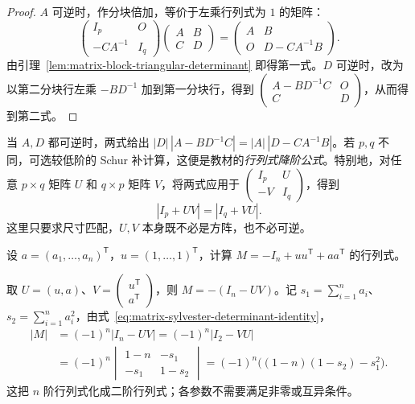 \begin{proof}
$A$ 可逆时，作分块倍加，等价于左乘行列式为 $1$ 的矩阵：
\[
    \begin{pmatrix}I_p&O\\-CA^{-1}&I_q\end{pmatrix}
    \begin{pmatrix}A&B\\C&D\end{pmatrix}
    =\begin{pmatrix}A&B\\O&D-CA^{-1}B\end{pmatrix}.
\]
由引理~\ref{lem:matrix-block-triangular-determinant} 即得第一式。$D$ 可逆时，改为以第二分块行左乘 $-BD^{-1}$ 加到第一分块行，得到 $\begin{pmatrix}A-BD^{-1}C&O\\C&D\end{pmatrix}$，从而得到第二式。
\end{proof}

当 $A,D$ 都可逆时，两式给出 $|D|\,|A-BD^{-1}C|=|A|\,|D-CA^{-1}B|$。若 $p,q$ 不同，可选较低阶的 Schur 补计算，这便是教材的\emph{行列式降阶公式}。特别地，对任意 $p\times q$ 矩阵 $U$ 和 $q\times p$ 矩阵 $V$，将两式应用于 $\begin{pmatrix}I_p&U\\-V&I_q\end{pmatrix}$，得到
\begin{equation}
\label{eq:matrix-sylvester-determinant-identity}
    |I_p+UV|=|I_q+VU|.
\end{equation}
这里只要求尺寸匹配，$U,V$ 本身既不必是方阵，也不必可逆。

\begin{example}
\label{ex:matrix-block-determinant-reduction}
设 $a=(a_1,\ldots,a_n)^{\mathsf T}$，$u=(1,\ldots,1)^{\mathsf T}$，计算 $M=-I_n+uu^{\mathsf T}+aa^{\mathsf T}$ 的行列式。
\end{example}

\begin{solve}
取 $U=(u,a)$、$V=\begin{pmatrix}u^{\mathsf T}\\a^{\mathsf T}\end{pmatrix}$，则 $M=-(I_n-UV)$。记 $s_1=\sum_{i=1}^{n}a_i$、$s_2=\sum_{i=1}^{n}a_i^2$，由式~\eqref{eq:matrix-sylvester-determinant-identity}，
\[
    \begin{aligned}
        |M|&=(-1)^n|I_n-UV|=(-1)^n|I_2-VU|\\
        &=(-1)^n\begin{vmatrix}1-n&-s_1\\-s_1&1-s_2\end{vmatrix}
        =(-1)^n\bigl((1-n)(1-s_2)-s_1^2\bigr).
    \end{aligned}
\]
这把 $n$ 阶行列式化成二阶行列式；各参数不需要满足非零或互异条件。
\end{solve}

